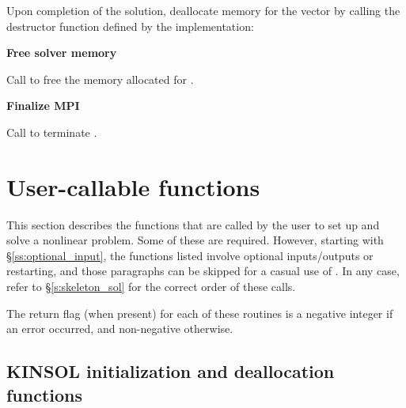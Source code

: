 \begin{Steps}
  Upon completion of the solution, deallocate memory for the vector 
  by calling the destructor function defined by the {\nvector} implementation:

  {\s} 

  {\p} 
  
\item
  {\bf Free solver memory}

  Call  to free the memory allocated for {\kinsol}.
  
\item 
  {\bf {\p} Finalize MPI}

  Call  to terminate {\mpi}.
  
\end{Steps}


\section{User-callable functions}\label{s:kinsol_fct_sol}

This section describes the {\kinsol} functions that are called by the
user to set up and solve a nonlinear problem. Some of these are required. 
However, starting with \S\ref{ss:optional_input}, the functions listed involve
optional inputs/outputs or restarting, and those paragraphs can be
skipped for a casual use of {\kinsol}. In any case, refer to
\S\ref{s:skeleton_sol} for the correct order of these calls.

The return flag (when present) for each of these routines is a
negative integer if an error occurred, and non-negative otherwise.


\subsection{KINSOL initialization and deallocation functions}
\label{sss:kinmalloc}

